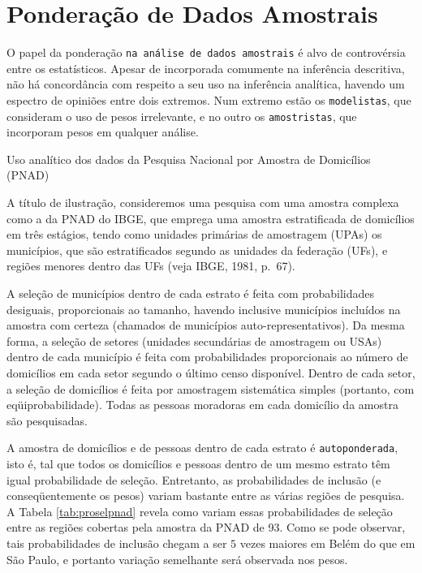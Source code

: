 \documentclass[]{book}
\numberwithin{example}{chapter}
\numberwithin{remark}{chapter}
\numberwithin{definition}{chapter}
\let\BeginKnitrBlock\begin \let\EndKnitrBlock\end
\begin{document}
\section{Ponderação de Dados
Amostrais}\label{ponderacao-de-dados-amostrais}

O papel da ponderação \texttt{na\ análise\ de\ dados\ amostrais} é alvo
de controvérsia entre os estatísticos. Apesar de incorporada comumente
na inferência descritiva, não há concordância com respeito a seu uso na
inferência analítica, havendo um espectro de opiniões entre dois
extremos. Num extremo estão os \texttt{modelistas}, que consideram o uso
de pesos irrelevante, e no outro os \texttt{amostristas}, que incorporam
pesos em qualquer análise.

\BeginKnitrBlock{example}
\protect\hypertarget{ex:unnamed-chunk-58}{}{\label{ex:unnamed-chunk-58}}Uso
analítico dos dados da Pesquisa Nacional por Amostra de Domicílios
(PNAD)
\EndKnitrBlock{example}

A título de ilustração, consideremos uma pesquisa com uma amostra
complexa como a da PNAD do IBGE, que emprega uma amostra estratificada
de domicílios em três estágios, tendo como unidades primárias de
amostragem (UPAs) os municípios, que são estratificados segundo as
unidades da federação (UFs), e regiões menores dentro das UFs (veja
IBGE, 1981, p.~67).

A seleção de municípios dentro de cada estrato é feita com
probabilidades desiguais, proporcionais ao tamanho, havendo inclusive
municípios incluídos na amostra com certeza (chamados de municípios
auto-representativos). Da mesma forma, a seleção de setores (unidades
secundárias de amostragem ou USAs) dentro de cada município é feita com
probabilidades proporcionais ao número de domicílios em cada setor
segundo o último censo disponível. Dentro de cada setor, a seleção de
domicílios é feita por amostragem sistemática simples (portanto, com
eqüiprobabilidade). Todas as pessoas moradoras em cada domicílio da
amostra são pesquisadas.

A amostra de domicílios e de pessoas dentro de cada estrato é
\texttt{autoponderada}, isto é, tal que todos os domicílios e pessoas
dentro de um mesmo estrato têm igual probabilidade de seleção.
Entretanto, as probabilidades de inclusão (e conseqüentemente os pesos)
variam bastante entre as várias regiões de pesquisa. A Tabela
\ref{tab:proselpnad} revela como variam essas probabilidades de seleção
entre as regiões cobertas pela amostra da PNAD de 93. Como se pode
observar, tais probabilidades de inclusão chegam a ser \(5\) vezes
maiores em Belém do que em São Paulo, e portanto variação semelhante
será observada nos pesos.
\end{document}
